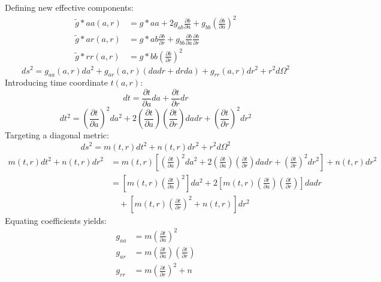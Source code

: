 \documentclass[11pt, a4paper]{report}
\begin{document}
Defining new effective components:
\begin{align}
\tilde{g}*{aa}(a,r) &= g*{aa} + 2g_{ab} \frac{\partial b}{\partial a} + g_{bb} \left( \frac{\partial b}{\partial a} \right)^2 \\
\tilde{g}*{ar}(a,r) &= g*{ab} \frac{\partial b}{\partial r} + g_{bb} \frac{\partial b}{\partial a} \frac{\partial b}{\partial r} \\
\tilde{g}*{rr}(a,r) &= g*{bb} \left( \frac{\partial b}{\partial r} \right)^2
\end{align}
\begin{equation}
ds^{2}=g_{aa}(a,r)da^{2}+g_{ar}(a,r)(da dr+dr da)+g_{rr}(a,r)dr^{2}+r^{2}d\Omega^{2}
\end{equation}
Introducing time coordinate $t(a,r)$:
\begin{equation}
dt = \frac{\partial t}{\partial a} da + \frac{\partial t}{\partial r} dr
\end{equation}
\begin{equation}
dt^{2} = \left( \frac{\partial t}{\partial a} \right)^2 da^{2} + 2 \left( \frac{\partial t}{\partial a} \right) \left( \frac{\partial t}{\partial r} \right) da dr + \left( \frac{\partial t}{\partial r} \right)^2 dr^{2}
\end{equation}
Targeting a diagonal metric:
\begin{equation}
ds^{2} = m(t,r)dt^{2} + n(t,r)dr^{2} + r^{2}d\Omega^{2}
\end{equation}
\begin{align}
m(t,r)dt^{2} + n(t,r)dr^{2} &= m(t,r) \left[ \left( \frac{\partial t}{\partial a} \right)^2 da^{2} + 2 \left( \frac{\partial t}{\partial a} \right) \left( \frac{\partial t}{\partial r} \right) da dr + \left( \frac{\partial t}{\partial r} \right)^2 dr^{2} \right] + n(t,r)dr^{2} \nonumber \\
&= \left[ m(t,r) \left( \frac{\partial t}{\partial a} \right)^2 \right] da^{2} + 2 \left[ m(t,r) \left( \frac{\partial t}{\partial a} \right) \left( \frac{\partial t}{\partial r} \right) \right] da dr \nonumber \\
&\quad + \left[ m(t,r) \left( \frac{\partial t}{\partial r} \right)^2 + n(t,r) \right] dr^{2}
\end{align}
Equating coefficients yields:
\begin{align}
g_{aa} &= m \left( \frac{\partial t}{\partial a} \right)^2 \\
g_{ar} &= m \left( \frac{\partial t}{\partial a} \right) \left( \frac{\partial t}{\partial r} \right) \\
g_{rr} &= m \left( \frac{\partial t}{\partial r} \right)^2 + n
\end{align}
\end{document}
